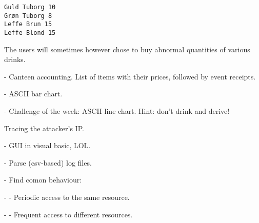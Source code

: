 \begin{verbatim}
Guld Tuborg 10
Grøn Tuborg 8
Leffe Brun 15
Leffe Blond 15
\end{verbatim}

The users will
sometimes however chose to buy abnormal quantities of various drinks.

- Canteen accounting. List of items with their prices, followed by event
  receipts.

- ASCII bar chart.

- Challenge of the week: ASCII line chart. Hint: don't drink and derive!

Tracing the attacker's IP.

- GUI in visual basic, LOL.

- Parse (csv-based) log files.

- Find comon behaviour:

- - Periodic access to the same resource.

- - Frequent access to different resources.
